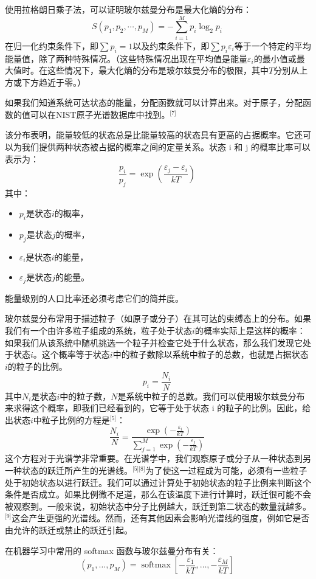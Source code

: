 使用拉格朗日乘子法，可以证明玻尔兹曼分布是最大化熵的分布：
\[
S(p_1, p_2, \cdots, p_M) = -\sum_{i=1}^{M} p_i \log_2 p_i~
\]
在归一化约束条件下，即\(\sum p_i = 1\)以及约束条件下，即\(\sum p_i \varepsilon_i\)等于一个特定的平均能量值，除了两种特殊情况。（这些特殊情况出现在平均值是能量\(\varepsilon_i\)的最小值或最大值时。在这些情况下，最大化熵的分布是玻尔兹曼分布的极限，其中\(T\)分别从上方或下方趋近于零。）

如果我们知道系统可达状态的能量，分配函数就可以计算出来。对于原子，分配函数的值可以在NIST原子光谱数据库中找到。\(^\text{[7]}\)

该分布表明，能量较低的状态总是比能量较高的状态具有更高的占据概率。它还可以为我们提供两种状态被占据的概率之间的定量关系。状态 i 和 j 的概率比率可以表示为：
\[
\frac{p_i}{p_j} = \exp \left( \frac{\varepsilon_j - \varepsilon_i}{kT} \right)~
\]
其中：
\begin{itemize}
\item \( p_i \)是状态\(i\)的概率，  
\item \( p_j \)是状态\(j\)的概率，  
\item \( \varepsilon_i \)是状态\(i\)的能量，  
\item \( \varepsilon_j \)是状态\(j\)的能量。
\end{itemize}
能量级别的人口比率还必须考虑它们的简并度。

玻尔兹曼分布常用于描述粒子（如原子或分子）在其可达的束缚态上的分布。如果我们有一个由许多粒子组成的系统，粒子处于状态\(i\)的概率实际上是这样的概率：如果我们从该系统中随机挑选一个粒子并检查它处于什么状态，那么我们发现它处于状态\(i\)。这个概率等于状态\(i\)中的粒子数除以系统中粒子的总数，也就是占据状态\(i\)的粒子的比例。
\[
p_i = \frac{N_i}{N}~
\]
其中\( N_i \)是状态\(i\)中的粒子数，\( N \)是系统中粒子的总数。我们可以使用玻尔兹曼分布来求得这个概率，即我们已经看到的，它等于处于状态 i 的粒子的比例。因此，给出状态\(i\)中粒子比例的方程是\(^\text{[5]}\)：
\[
\frac{N_i}{N} = \frac{\exp \left( -\frac{\varepsilon_i}{kT} \right)}{\sum_{j=1}^{M} \exp \left( -\frac{\varepsilon_j}{kT} \right)}~
\]
这个方程对于光谱学非常重要。在光谱学中，我们观察原子或分子从一种状态到另一种状态的跃迁所产生的光谱线。\(^\text{[5][8]}\)为了使这一过程成为可能，必须有一些粒子处于初始状态以进行跃迁。我们可以通过计算处于初始状态的粒子比例来判断这个条件是否成立。如果比例微不足道，那么在该温度下进行计算时，跃迁很可能不会被观察到。一般来说，初始状态中分子比例越大，跃迁到第二状态的数量就越多。\(^\text{[9]}\)这会产生更强的光谱线。然而，还有其他因素会影响光谱线的强度，例如它是否由允许的跃迁或禁止的跃迁引起。

在机器学习中常用的 softmax 函数与玻尔兹曼分布有关：
\[
(p_1, \ldots, p_M) = \operatorname{softmax} \left[ -\frac{\varepsilon_1}{kT}, \ldots, -\frac{\varepsilon_M}{kT} \right]~
\]
